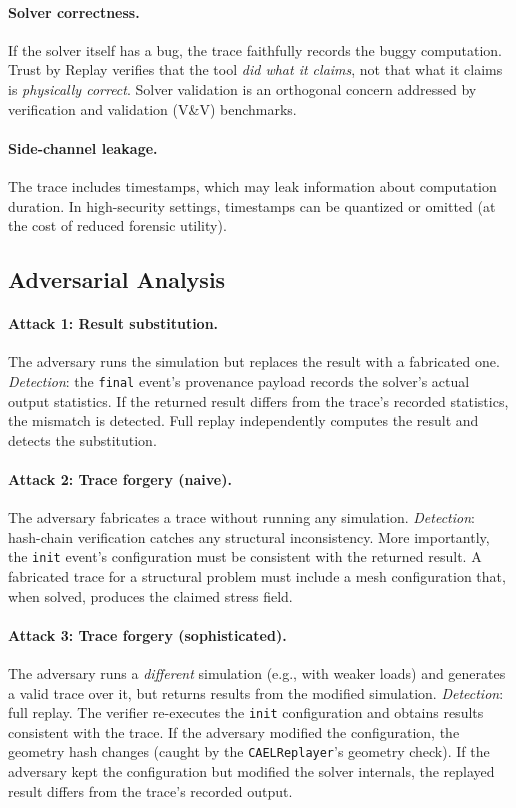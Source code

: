 \documentclass[letterpaper,twocolumn,10pt]{article}
\begin{document}
\paragraph{Solver correctness.} If the solver itself has a bug, the trace
faithfully records the buggy computation. Trust by Replay verifies that the
tool \emph{did what it claims}, not that what it claims is \emph{physically
correct}. Solver validation is an orthogonal concern addressed by
verification and validation (V\&V) benchmarks.

\paragraph{Side-channel leakage.} The trace includes timestamps, which may
leak information about computation duration. In high-security settings,
timestamps can be quantized or omitted (at the cost of reduced forensic
utility).

\subsection{Adversarial Analysis}

\paragraph{Attack 1: Result substitution.} The adversary runs the simulation
but replaces the result with a fabricated one. \emph{Detection}: the
\texttt{final} event's provenance payload records the solver's actual output
statistics. If the returned result differs from the trace's recorded
statistics, the mismatch is detected. Full replay independently computes
the result and detects the substitution.

\paragraph{Attack 2: Trace forgery (naive).} The adversary fabricates a trace
without running any simulation. \emph{Detection}: hash-chain verification
catches any structural inconsistency. More importantly, the \texttt{init}
event's configuration must be consistent with the returned result. A
fabricated trace for a structural problem must include a mesh configuration
that, when solved, produces the claimed stress field.

\paragraph{Attack 3: Trace forgery (sophisticated).} The adversary runs a
\emph{different} simulation (e.g., with weaker loads) and generates a valid
trace over it, but returns results from the modified simulation.
\emph{Detection}: full replay. The verifier re-executes the \texttt{init}
configuration and obtains results consistent with the trace. If the adversary
modified the configuration, the geometry hash changes (caught by the
\texttt{CAELReplayer}'s geometry check). If the adversary kept the
configuration but modified the solver internals, the replayed result differs
from the trace's recorded output.
\end{document}
